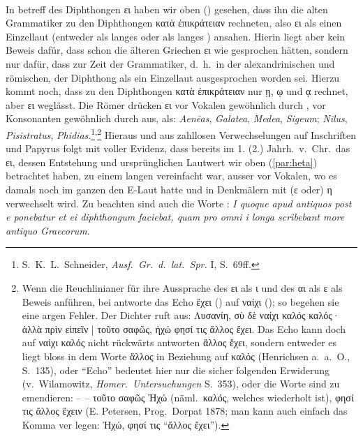 \paragraph{\label{par:betreffdesditp}} In betreff des Diphthongen ει haben wir oben
() gesehen, dass ihn die
alten Grammatiker zu den Diphthongen κατὰ ἐπικράτειαν rechneten, also ει als einen
Einzellaut (entweder als langes  oder  als langes ) ansahen.
Hierin liegt aber
kein Beweis dafür, dass schon die älteren Griechen ει wie  gesprochen hätten,
sondern nur dafür, dass zur Zeit der Grammatiker, d.~h.~in der alexandrinischen
und römischen, der Diphthong als ein Einzellaut ausgesprochen worden sei.
Hierzu kommt noch, dass  zu den Diphthongen κατὰ
ἐπικράτειαν nur ῃ, ῳ und ᾳ
rechnet, aber ει weglässt.
Die Römer drücken ει vor Vokalen gewöhnlich durch ,
vor Konsonanten gewöhnlich durch  aus, als: \emph{Aenēas},
\emph{Galatea}, \emph{Medea}, \emph{Sigeum};
\emph{Nīlus}, \emph{Pisistratus}, \emph{Phidias}.\footnote{%
	S.~K.~L.~Schneider, \emph{Ausf.\ Gr.\ d.\ lat.\ Spr.} I, S.\ 69ff.}\textsuperscript{,}\footnote{%
	Wenn die Reuchlinianer für ihre
	Aussprache des ει als ι und des αι als ε als Beweis anführen, bei
	 antworte das Echo ἔχει () auf ναίχι
	();
	so begehen sie eine argen Fehler.
	Der Dichter ruft aus: Λυσανίη, σὺ δὲ ναίχι καλός καλός· ἀλλὰ πρὶν εἰπεῖν | τοῦτο
	σαφῶς, ἠχώ φησί τις ἄλλος ἔχει.
	Das Echo kann doch auf ναίχι καλός nicht rückwärts antworten ἄλλος ἔχει, sondern
	entweder es liegt bloss in dem Worte ἄλλος in Beziehung auf καλός (Henrichsen
	a.~a.~O., S.\ 135), oder ``Echo'' bedeutet hier nur die sicher folgenden
	Erwiderung (v.\ Wilamowitz, \emph{Homer.\ Untersuchungen} S.\ 353), oder die Worte sind
	zu emendieren: -- -- τοῦτο σαφῶς Ἠχώ (näml.\ καλός, welches wiederholt ist), φησί
	τις ἄλλος ἔχειν (E. Petersen, Prog.\ Dorpat 1878; man kann auch einfach das
	Komma ver legen: Ἠχώ, φησί τις ``ἄλλος ἔχει'').
}
Hieraus und aus zahllosen Verwechselungen auf
Inschriften und Papyrus folgt mit voller Evidenz, dass bereits im 1. (2.)
Jahrh.\ v.\ Chr.\ das ει, dessen Entstehung und ursprünglichen Lautwert wir oben
(\ref{par:heta})
betrachtet haben, zu einem langen  vereinfacht war, ausser vor Vokalen, wo es
damals noch im ganzen den E-Laut hatte und in  Denkmälern mit (ε
oder) η verwechselt wird.
Zu beachten sind auch die Worte : \emph{I quoque apud
	antiquos post  e ponebatur et ei diphthongum faciebat, quam pro omni i
	longa scribebant more antiquo Graecorum}.
